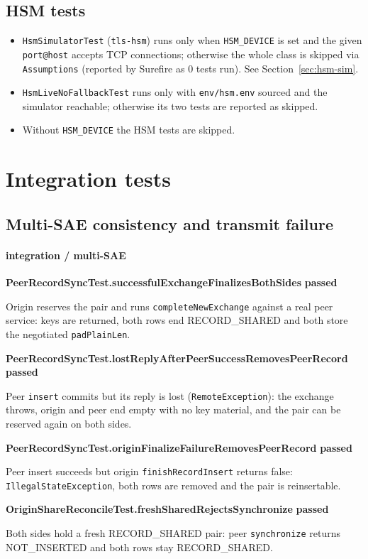 \documentclass[11pt,a4paper]{report}
\newcommand{\testcase}[3]{%
  \begin{tcolorbox}[
    colback=cardbg,
    colframe=cardborder,
    boxrule=0.5pt,
    arc=2.5pt,
    left=8pt, right=8pt, top=6pt, bottom=6pt,
    before skip=4pt, after skip=4pt,
    breakable
  ]
  {\small\ttfamily\bfseries #1} \hfill {\small\bfseries\color{status-#2}#2}\par
  \vspace{3pt}
  {\small\color{black!85} #3}
  \end{tcolorbox}%
}
\begin{document}
\section{HSM tests}
\begin{itemize}
  \item \texttt{HsmSimulatorTest} (\texttt{tls-hsm}) runs only when \texttt{HSM\_DEVICE} is set and the given \texttt{port@host} accepts TCP connections; otherwise the whole class is skipped via \texttt{Assumptions} (reported by Surefire as 0 tests run). See Section~\ref{sec:hsm-sim}.
  \item \texttt{HsmLiveNoFallbackTest} runs only with \texttt{env/hsm.env} sourced and the simulator reachable; otherwise its two tests are reported as skipped.
  \item Without \texttt{HSM\_DEVICE} the HSM tests are skipped.
\end{itemize}

\chapter{Integration tests}

\section{Multi-SAE consistency and transmit failure}
\subsubsection{integration / multi-SAE}

\testcase{PeerRecordSyncTest.successfulExchangeFinalizesBothSides}{passed}{Origin reserves the pair and runs \texttt{completeNewExchange} against a real peer service: keys are returned, both rows end RECORD\_SHARED and both store the negotiated \texttt{padPlainLen}.}

\testcase{PeerRecordSyncTest.lostReplyAfterPeerSuccessRemovesPeerRecord}{passed}{Peer \texttt{insert} commits but its reply is lost (\texttt{RemoteException}): the exchange throws, origin and peer end empty with no key material, and the pair can be reserved again on both sides.}

\testcase{PeerRecordSyncTest.originFinalizeFailureRemovesPeerRecord}{passed}{Peer insert succeeds but origin \texttt{finishRecordInsert} returns false: \texttt{IllegalStateException}, both rows are removed and the pair is reinsertable.}

\testcase{OriginShareReconcileTest.freshSharedRejectsSynchronize}{passed}{Both sides hold a fresh RECORD\_SHARED pair: peer \texttt{synchronize} returns NOT\_INSERTED and both rows stay RECORD\_SHARED.}
\end{document}
